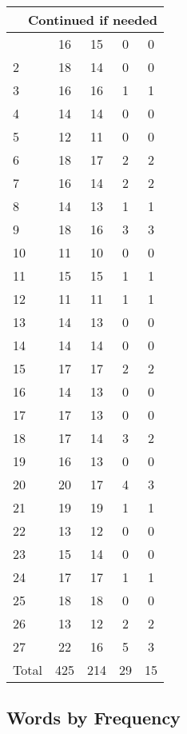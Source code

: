 \begin{center}
\begin{longtable}{l|c|c|c|c}
\hline \multicolumn{5}{|r|}{{Continued if needed}} \\ \hline
\endfoot 
1 & 16 & 15 & 0 & 0\\ \hline
2 & 18 & 14 & 0 & 0\\ \hline
3 & 16 & 16 & 1 & 1\\ \hline
4 & 14 & 14 & 0 & 0\\ \hline
5 & 12 & 11 & 0 & 0\\ \hline
6 & 18 & 17 & 2 & 2\\ \hline
7 & 16 & 14 & 2 & 2\\ \hline
8 & 14 & 13 & 1 & 1\\ \hline
9 & 18 & 16 & 3 & 3\\ \hline
10 & 11 & 10 & 0 & 0\\ \hline
11 & 15 & 15 & 1 & 1\\ \hline
12 & 11 & 11 & 1 & 1\\ \hline
13 & 14 & 13 & 0 & 0\\ \hline
14 & 14 & 14 & 0 & 0\\ \hline
15 & 17 & 17 & 2 & 2\\ \hline
16 & 14 & 13 & 0 & 0\\ \hline
17 & 17 & 13 & 0 & 0\\ \hline
18 & 17 & 14 & 3 & 2\\ \hline
19 & 16 & 13 & 0 & 0\\ \hline
20 & 20 & 17 & 4 & 3\\ \hline
21 & 19 & 19 & 1 & 1\\ \hline
22 & 13 & 12 & 0 & 0\\ \hline
23 & 15 & 14 & 0 & 0\\ \hline
24 & 17 & 17 & 1 & 1\\ \hline
25 & 18 & 18 & 0 & 0\\ \hline
26 & 13 & 12 & 2 & 2\\ \hline
27 & 22 & 16 & 5 & 3\\ \hline
\hline \hline
Total & 425 & 214 & 29 & 15




\end{longtable}
\end{center}



\subsection{Words by Frequency}

